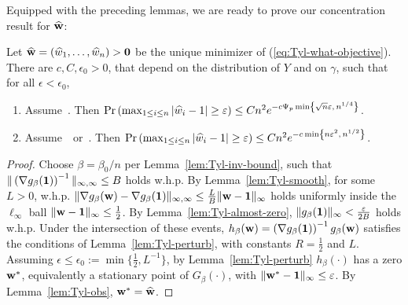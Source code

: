 \documentclass[times,sort&compress,3p]{elsarticle}
\begin{document}
Equipped with the preceding lemmas, we are ready to prove our concentration result for $\widehat{{\bf w}}$:
\begin{lemma}\label{lem:Tyl-conc-what}
Let $\widehat{{\bf w}}=(\widehat{w}_1,\ldots,\widehat{w}_n)>\bm{0}$ be the unique minimizer of (\ref{eq:Tyl-what-objective}).  
There are $c,C,\epsilon_0>0$, that depend on the distribution of $Y$ and on $\gamma$, such that for all $\epsilon<\epsilon_0$,
\begin{enumerate}
    \item Assume~\AssumLC. Then $\Pr\left( \max_{1\le i \le n}\left| \widehat{w}_i-1\right| \ge \varepsilon \right) \le Cn^2 e^{-c \Psi_p\min\left\{ \sqrt{n}\varepsilon,\,  n^{1/4}\right\} } $.
    \item Assume~\AssumIndep~or~\AssumCCPSB. Then $\Pr\left( \max_{1\le i \le n}\left| \widehat{w}_i-1\right| \ge \varepsilon \right) \le Cn^2 e^{-c \min\left\{ n\varepsilon^2,\, n^{1/2}\right\}}$.
\end{enumerate}
\end{lemma}
\begin{proof}
        Choose $\beta=\beta_0/n$ per Lemma~\ref{lem:Tyl-inv-bound}, such that $\|\left( \nabla g_\beta({\bf 1})\right)^{-1}\|_{\infty,\infty}\le B$ holds w.h.p. By Lemma~\ref{lem:Tyl-smooth}, for some $L>0$, w.h.p.
        $\| \nabla g_\beta({\bf w})- \nabla g_\beta({\bf 1})\|_{\infty,\infty}\le \frac{L}{B} \|{\bf w}-{\bf 1}\|_\infty$ holds uniformly inside the $\ell_\infty$ ball $\|{\bf w}-{\bf 1}\|_\infty\le \frac12$. By Lemma~\ref{lem:Tyl-almost-zero}, $\|g_\beta({\bf 1})\|_\infty < \frac{\varepsilon}{2B}$ holds w.h.p.
        Under the intersection of these events, $h_\beta({\bf w})=\left(\nabla g_\beta({\bf 1})\right)^{-1}  g_\beta({\bf w})$ satisfies the conditions of Lemma~\ref{lem:Tyl-perturb}, with constants $R=\frac12$ and $L$.  Assuming $\epsilon\le \epsilon_0:=\min\{\frac12,L^{-1}\}$, by Lemma~\ref{lem:Tyl-perturb} $h_\beta(\cdot)$ has a zero ${\bf w}^*$, equivalently a stationary point of $G_\beta(\cdot)$, with $\|{\bf w}^*-{\bf 1}\|_\infty\le \varepsilon$. By Lemma~\ref{lem:Tyl-obs}, ${\bf w}^*=\widehat{{\bf w}}$. 

\end{proof}
\end{document}
